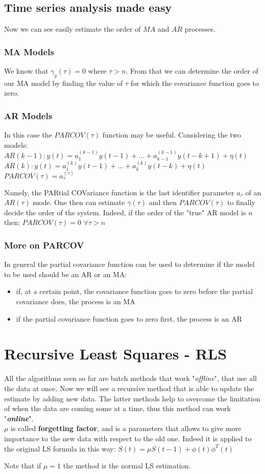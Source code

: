\documentclass[10pt,a4paper]{article}
\begin{document}
\subsection{Time series analysis made easy}
Now we can see easily estimate the order of $MA$ and $AR$ processes.
\subsubsection{MA Models}
We know that $\gamma_y(\tau)=0$ where $\tau > n$. From that we can determine the order of our MA model by finding the value of $\tau$ for which the covariance function goes to zero.
\subsubsection{AR Models} 
In this case the $PARCOV(\tau)$ function may be useful. Considering the two models:
\center 
	$AR(k-1):y(t)=a_1^{(k-1)}y(t-1)+...+a_{k-1}^{(k-1)}y(t-k+1) + \eta(t)$ \\
	$AR(k):y(t)=a_1^{(k)}y(t-1)+...+a_{k}^{(k)}y(t-k) + \eta(t)$ \\
	$PARCOV(\tau)=a_\tau^{(\tau)}$ \\
	\raggedright \vspace{0.5em}
	Namely, the PARtial COVariance function is the last identifier parameter $a_\tau$ of an $AR(\tau)$ mode. One then can estimate $\gamma(\tau)$ and then $PARCOV(\tau)$ to finally decide the order of the system. Indeed, if the order of the "true" AR model is $n$ then:
	\center $PARCOV(\tau)=0$ $\forall \tau > n$
	\\ \raggedright
\subsubsection{More on PARCOV}
In general the partial covariance function can be used to determine if the model to be used should be an AR or an MA:
\begin{itemize}
	\item if, at a certain point, the covariance function goes to zero before the partial covariance does, the process is an MA
	\item if the partial covariance function goes to zero first, the process is an AR
\end{itemize}
\section{Recursive Least Squares - RLS}
All the algorithms seen so far are batch methods that work "\textit{offline}", that use all the data at once. Now we will see a recursive method that is able to update the estimate by adding new data. The latter methods help to overcome the limitation of when the data are coming some at a time, thus this method can work "\textbf{\textit{online}}". \\
$\mu$ is called \textbf{forgetting factor}, and is a parameters that allows to give more importance to the new data with respect to the old one. Indeed it is applied to the original LS formula in this way: 
\center
	$S(t)=\mu S(t-1)+\phi(t)\phi^T(t)$
\\ \raggedright
Note that if $\mu=1$ the method is the normal LS estimation.
\end{document}
